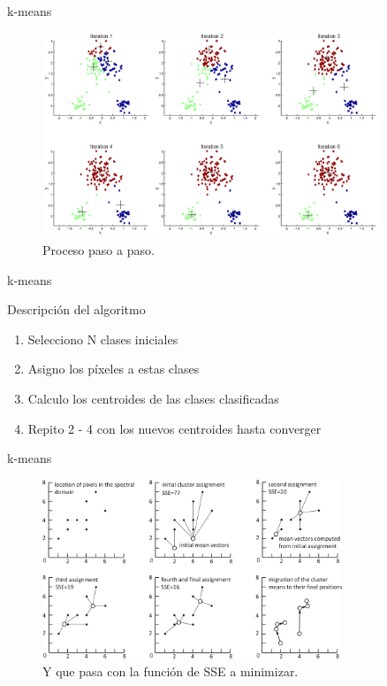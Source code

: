 \documentclass[handout]{beamer}
\begin{document}
\begin{frame}{k-means}
  \begin{figure}
    \includegraphics[width=0.9\textwidth]{imagenes/step.png}
    \caption{Proceso paso a paso.}
  \end{figure}
\end{frame}

\begin{frame}{k-means}
  \begin{block}{Descripción del algoritmo}
    \begin{enumerate}[<+>]
      \item Selecciono N clases iniciales
      \item Asigno los píxeles a estas clases
      \item Calculo los centroides de las clases clasificadas
      \item Repito 2 - 4 con los nuevos centroides hasta converger
    \end{enumerate}
  \end{block}
\end{frame}

\begin{frame}{k-means}
  \begin{figure}
    \includegraphics[width=0.8\textwidth]{imagenes/sse.png}
    \caption{Y que pasa con la función de SSE a minimizar. }
  \end{figure}
\end{frame}
\end{document}
